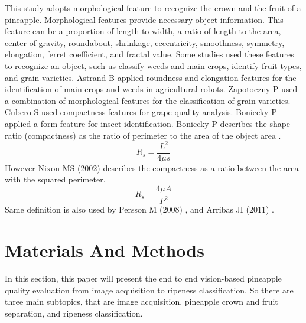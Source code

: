 \documentclass[11pt]{article}
\begin{document}
\begin{linenumbers}
This study adopts morphological feature to recognize the crown and the fruit of a pineapple. Morphological features provide necessary object information. This feature can be a proportion of length to width, a ratio of length to the area, center of gravity, roundabout, shrinkage, eccentricity, smoothness, symmetry, elongation, ferret coefficient, and fractal value. Some studies used these features to recognize an object, such us classify weeds and main crops, identify fruit types, and grain varieties. Astrand B \cite{Astrand:2002} applied roundness and elongation features for the identification of main crops and weeds in agricultural robots. Zapotoczny P \cite{Zapotoczny:2008} used a combination of morphological features for the classification of grain varieties. Cubero S \cite{Cubero:2014} used compactness features for grape quality analysis. Boniecky P \cite{Boniecki:2015} applied a form feature for insect identification. Boniecky P describes the shape ratio (compactness) as the ratio of perimeter to the area of the object area \cite{Boniecki:2015}.
\begin{equation}
	R_s=\frac{L^2}{4\mu s}
\end{equation}
However Nixon MS (2002) \cite{Nixon:2013} describes the compactness as a ratio between the area with the squared perimeter.
\begin{equation}
	R_s=\frac{4 \mu A}{P^2}
\end{equation}
Same definition is also used by Persson M (2008) \cite{Persson:2008}, and Arribas JI (2011) \cite{Arribas:2011}. 

\section{Materials And Methods}
In this section, this paper will present the end to end vision-based pineapple quality evaluation from image acquisition to ripeness classification. So there are three main subtopics, that are image acquisition, pineapple crown and fruit separation, and ripeness classification.


\end{linenumbers}
\end{document}
